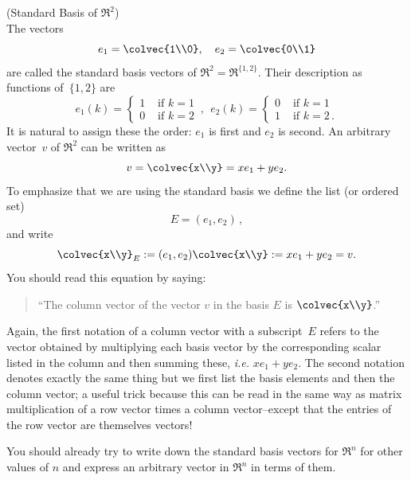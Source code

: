 \begin{example} (Standard Basis of $\Re^2$)\\
The vectors 
\[
e_1=\colvec{1\\0},~~~
e_2=\colvec{0\\1}
\]
are called the standard basis vectors of $\Re^2=\Re^{\{1,2\}}$. 
Their description as functions of~$\{1,2\}$ are 
\begin{displaymath}
   e_1 (k)= \left\{
     \begin{array}{lr}
       1 & \text{~if~} k=1\\
       0 & \text{~if~} k=2
     \end{array}
   \right. \, ,~~
   e_2 (k)= \left\{
     \begin{array}{ll}
       0 & \text{~if~} k=1\\
       1 & \text{~if~} k=2\, .
     \end{array}
   \right.
\end{displaymath} 
It is  natural to assign these  the order: $e_1$ is first and $e_2$ is second.
An arbitrary vector~$v$ of $\Re^2$ can be written as  
\[
v=\colvec{x\\y}=x e_1+ ye_2 .
\]
To emphasize that we are using the standard basis we define the list (or ordered set) \[E=(e_1,e_2)\, ,\] and write 
\[
\colvec{x\\y}_E:=(e_1,e_2)\colvec{x\\y}:=x e_1+ ye_2=v .
\]
You should read this equation by saying:
\begin{quote}
``The column vector of the vector $v$ in the basis $E$ is $\colvec{x\\y}$.''
\end{quote}

Again, the first notation of a column vector with a subscript~$E$ refers to the vector obtained by multiplying each basis vector
by the corresponding scalar listed in the column and then  summing these, {\itshape i.e.} $xe_1+y e_2$. 
The second notation denotes exactly the same thing but we first list the basis elements and then the column vector; a useful trick
because this can be read in the same way as matrix multiplication of a row vector times a column vector--except that the entries of the row vector are themselves vectors! 
\end{example}

You should already try to write down the standard basis vectors for $\Re^n$ for other values of $n$ and express an arbitrary vector in $\Re^n$  in terms of them.%

